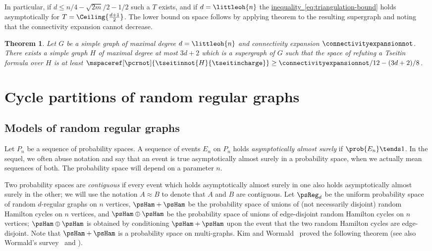 \documentclass[11pt]{article}
\numberwithin{equation}{section}
\newtheorem{theorem}{Theorem}[section]
\theoremstyle{definition}
\theoremstyle{plain}
\newcommand{\expeqref}[2]{\hyperref[#2]{#1~\eqref{#2}}}
\begin{document}
In particular, if $d\leq n/4-\sqrt{2 m}/2-1/2$ such a $T$ exists, and if $d=\littleoh{n}$ the \expeqref{inequality}{eq:triangulation-bound} holds asymptotically for $T=\Ceiling{\frac{d+1}{2}}$. The lower bound on space follows by applying theorem  to the resulting supergraph and noting that the connectivity expansion cannot decrease.

\begin{theorem}
\label{th:triangulation}
Let $G$ be a simple graph of maximal degree $d=\littleoh{n}$ and connectivity expansion $\connectivityexpansionnot$. There exists a simple graph $H$ of maximal degree at most $3d+2$ which is a supergraph of $G$ such that the space of refuting a Tseitin formula over $H$ is at least $\mspaceref[\pcrnot]{\tseitinnot{H}{\tseitincharge}} \geq \connectivityexpansionnot/12-(3d+2)/8$.
\end{theorem}
\section{Cycle partitions of random regular graphs} 
\label{sec:cycle-partitions}

\subsection{Models of random regular graphs}
Let $P_n$ be a sequence of probability spaces. A sequence of events $E_n$ on $P_n$ holds \emph{asymptotically almost surely} if $\prob{E_n} \tends 1$. In the sequel, we often abuse notation and say that an event is true asymptotically almost surely in a probability space, when we actually mean sequences of both. The probability space will depend on a parameter $n$.

Two probability spaces are \emph{contiguous} if every event which holds asymptotically almost surely in one also holds asymptotically almost surely in the other; we will use the notation $A \approx B$ to denote that $A$ and $B$ are contiguous.
%
%
%
%
Let $\psReg_d$ be the uniform probability space of random $d$-regular graphs on $n$ vertices, $\psHam+\psHam$ be the probability space of unions of (not necessarily disjoint) random Hamilton cycles on $n$ vertices, and $\psHam \oplus \psHam$ be the probability space of unions of edge-disjoint random Hamilton cycles on $n$ vertices; $\psHam \oplus \psHam$ is obtained by conditioning $\psHam + \psHam$ upon the event that the two random Hamilton cycles are edge-disjoint. Note that $\psHam + \psHam$ is a probability space on multi-graphs. Kim and Wormald~\cite{KW} proved the following theorem (see also Wormald's survey~\cite{W} and \cite[\S 9.3--9.6]{JLR}).
\end{document}
